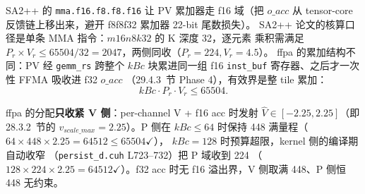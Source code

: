 SA2++ 的 \texttt{mma.f16.f8.f8.f16} 让 PV 累加器走 f16 域（把 $o\_acc$
从 tensor-core 反馈链上移出来，避开 f8f8f32 累加器 22-bit 尾数损失）。
SA2++ 论文的核算口径是单条 MMA 指令：$m16n8k32$ 的 K 深度 32，逐元素
乘积需满足 $P_r\times V_r\le65504/32=2047$，两侧同收（$P_r=224,V_r=4.5$）。
ffpa 的累加结构不同：PV 经 \texttt{gemm\_rs} 跨整个 $kBc$ 块累进同一组 f16
\texttt{inst\_buf} 寄存器、之后才一次性 FFMA 吸收进 f32 $o\_acc$
（29.4.3~节 Phase 4），有效界是整 tile 累加：
\begin{equation}
  kBc\cdot P_r\cdot V_r \le 65504 .
  \label{eq:29-f16tile}
\end{equation}

ffpa 的分配\textbf{只收紧 V 侧}：per-channel V + f16 acc 时发射
$\hat V\in[-2.25,2.25]$（即 28.3.2~节的 $v_{scale\_max}=2.25$）。P 侧在
$kBc\le64$ 时保持 448 满量程（$64\times448\times2.25=64512\le65504$$\checkmark$），
$kBc=128$ 时预算超限，kernel 侧的编译期自动收窄
（\texttt{persist\_d.cuh} L723--732）把 P 域收到 224
（$128\times224\times2.25=64512$$\checkmark$）。f32 acc 时无 f16 溢出界，V 侧取满
448、P 侧恒 448 无约束。

